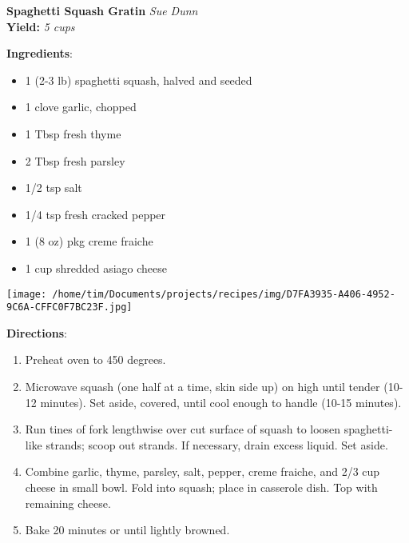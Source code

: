 \documentclass[11pt, twoside, openany]{book}
\begin{document}
\noindent\begin{minipage}[t]{\linewidth}%
{\Large\textbf{Spaghetti Squash Gratin}} \label{spaghetti-squash-gratin}\hfill\textit{Sue Dunn}\\
\textbf{Yield:} \textit{5 cups}\\
\noindent\begin{minipage}[t]{0.78\linewidth}%
\textbf{Ingredients}:\vspace{-3mm}
\begin{multicols}{2}
\begin{itemize}\setlength\itemsep{-1mm}
\item 1 (2-3 lb) spaghetti squash, halved and seeded
\item 1 clove garlic, chopped
\item 1 Tbsp fresh thyme
\item 2 Tbsp fresh parsley
\item 1/2 tsp salt
\item 1/4 tsp fresh cracked pepper
\item 1 (8 oz) pkg creme fraiche
\item 1 cup shredded asiago cheese
\end{itemize}
\end{multicols}
\end{minipage}
\noindent\begin{minipage}[t]{0.18\linewidth}
\centering \strut\vspace*{-\baselineskip}\newline
\texttt{[image: /home/tim/Documents/projects/recipes/img/D7FA3935-A406-4952-9C6A-CFFC0F7BC23F.jpg]}\\
\end{minipage}\vspace{3mm}
\textbf{Directions}:
\vspace{-3mm}\begin{enumerate}\setlength\itemsep{-1mm}
\item Preheat oven to 450 degrees. 
\item Microwave squash (one half at a time, skin side up) on high until tender (10-12 minutes). Set aside, covered, until cool enough to handle (10-15 minutes).
\item Run tines of fork lengthwise over cut surface of squash to loosen spaghetti-like strands; scoop out strands. If necessary, drain excess liquid. Set aside. 
\item Combine garlic, thyme, parsley, salt, pepper, creme fraiche, and 2/3 cup cheese in small bowl. Fold into squash; place in casserole dish. Top with remaining cheese.
\item Bake 20 minutes or until lightly browned.
\end{enumerate}
\end{minipage}\vspace{8mm}
\end{document}
